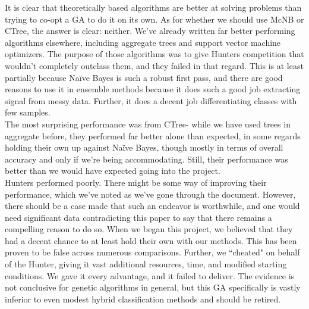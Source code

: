It is clear that theoretically based algorithms are better at solving problems than trying to co-opt a GA to do it on its own.  
As for whether we should use McNB or CTree, the answer is clear: neither.  We've already written far better performing algorithms elsewhere, including aggregate trees and support vector machine optimizers.  The purpose of those algorithms was to give Hunters competition that wouldn't completely outclass them, and they failed in that regard.  This is at least partially because Na\"ive Bayes is such a robust first pass, and there are good reasons to use it in ensemble methods because it does such a good job extracting signal from messy data.  Further, it does a decent job differentiating classes with few samples.\\
The most surprising performance was from CTree- while we have used trees in aggregate before, they performed far better alone than expected, in some regards holding their own up against Na\"ive Bayes, though mostly in terms of overall accuracy and only if we're being accommodating.  Still, their performance was better than we would have expected going into the project.\\
Hunters performed poorly.  There might be some way of improving their performance, which we've noted as we've gone through the document.  However, there should be a case made that such an endeavor is worthwhile, and one would need significant data contradicting this paper to say that there remains a compelling reason to do so.  When we began this project, we believed that they had a decent chance to at least hold their own with our methods.  This has been proven to be false across numerous comparisons.  Further, we ``cheated" on behalf of the Hunter, giving it vast additional resources, time, and modified starting conditions.  We gave it every advantage, and it failed to deliver.  The evidence is not conclusive for genetic algorithms in general, but this GA specifically is vastly inferior to even modest hybrid classification methods and should be retired.  